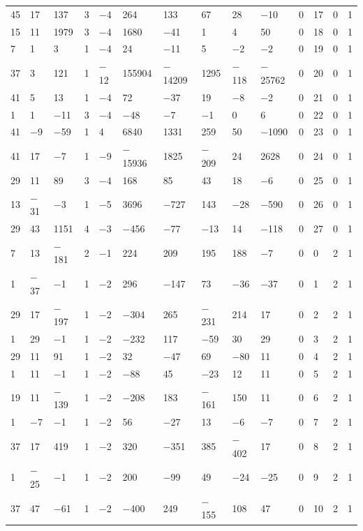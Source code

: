 \documentclass[10pt,a4paper]{amsart}
\numberwithin{equation}{section}
\theoremstyle{definition}
\numberwithin{table}{section}
\begin{document}
{\begin{paracol}{3}
\begin{supertabular}{|w{c}{.32cm}w{c}{.32cm}w{c}{.32cm}@{\hspace{.5cm}}w{c}{.2cm}w{c}{.2cm}|@{\hspace{\tabcolsep}}HHHHHHw{c}{.17cm}w{c}{.17cm}w{c}{.17cm}|}
			45 & 17 & 137 & 3 & $-$4 & 264 & 133 & 67 & 28 & $-$10 & 0 & 17 & 0 & 1 \\
			15 & 11 & 1979 & 3 & $-$4 & 1680 & $-$41 & 1 & 4 & 50 & 0 & 18 & 0 & 1 \\
			7 & 1 & 3 & 1 & $-$4 & 24 & $-$11 & 5 & $-$2 & $-$2 & 0 & 19 & 0 & 1 \\
			37 & 3 & 121 & 1 & $-$12 & 155904 & $-$14209 & 1295 & $-$118 & $-$25762 & 0 & 20 & 0 & 1 \\
			41 & 5 & 13 & 1 & $-$4 & 72 & $-$37 & 19 & $-$8 & $-$2 & 0 & 21 & 0 & 1 \\
			1 & 1 & $-$11 & 3 & $-$4 & $-$48 & $-$7 & $-$1 & 0 & 6 & 0 & 22 & 0 & 1 \\
			41 & $-$9 & $-$59 & 1 & 4 & 6840 & 1331 & 259 & 50 & $-$1090 & 0 & 23 & 0 & 1 \\
			41 & 17 & $-$7 & 1 & $-$9 & $-$15936 & 1825 & $-$209 & 24 & 2628 & 0 & 24 & 0 & 1 \\
			29 & 11 & 89 & 3 & $-$4 & 168 & 85 & 43 & 18 & $-$6 & 0 & 25 & 0 & 1 \\
			13 & $-$31 & $-$3 & 1 & $-$5 & 3696 & $-$727 & 143 & $-$28 & $-$590 & 0 & 26 & 0 & 1 \\
			29 & 43 & 1151 & 4 & $-$3 & $-$456 & $-$77 & $-$13 & 14 & $-$118 & 0 & 27 & 0 & 1 \\
			7 & 13 & $-$181 & 2 & $-$1 & 224 & 209 & 195 & 188 & $-$7 & 0 & 0 & 2 & 1 \\
			1 & $-$37 & $-$1 & 1 & $-$2 & 296 & $-$147 & 73 & $-$36 & $-$37 & 0 & 1 & 2 & 1 \\
			29 & 17 & $-$197 & 1 & $-$2 & $-$304 & 265 & $-$231 & 214 & 17 & 0 & 2 & 2 & 1 \\
			1 & 29 & $-$1 & 1 & $-$2 & $-$232 & 117 & $-$59 & 30 & 29 & 0 & 3 & 2 & 1 \\
			29 & 11 & 91 & 1 & $-$2 & 32 & $-$47 & 69 & $-$80 & 11 & 0 & 4 & 2 & 1 \\
			1 & 11 & $-$1 & 1 & $-$2 & $-$88 & 45 & $-$23 & 12 & 11 & 0 & 5 & 2 & 1 \\
			19 & 11 & $-$139 & 1 & $-$2 & $-$208 & 183 & $-$161 & 150 & 11 & 0 & 6 & 2 & 1 \\
			1 & $-$7 & $-$1 & 1 & $-$2 & 56 & $-$27 & 13 & $-$6 & $-$7 & 0 & 7 & 2 & 1 \\
			37 & 17 & 419 & 1 & $-$2 & 320 & $-$351 & 385 & $-$402 & 17 & 0 & 8 & 2 & 1 \\
			1 & $-$25 & $-$1 & 1 & $-$2 & 200 & $-$99 & 49 & $-$24 & $-$25 & 0 & 9 & 2 & 1 \\
			37 & 47 & $-$61 & 1 & $-$2 & $-$400 & 249 & $-$155 & 108 & 47 & 0 & 10 & 2 & 1 \\

\end{supertabular}
\end{paracol}}
\end{document}
